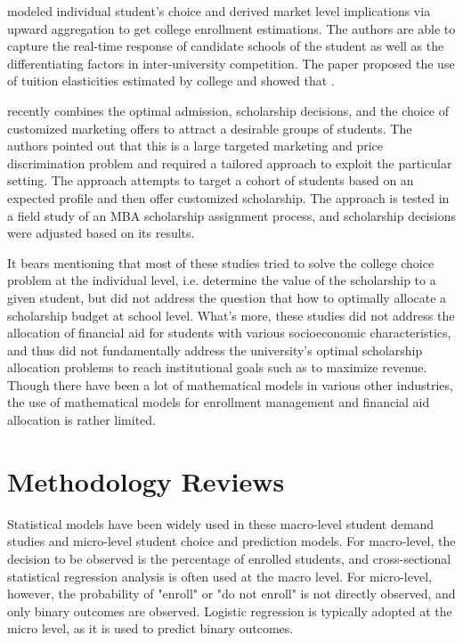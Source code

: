 \documentclass[12pt,english]{report}
\begin{document}
\citet{Carter2011} modeled individual student's choice and derived market level implications via upward aggregation to get college enrollment estimations. The authors are able to capture the real-time response of 
candidate schools of the student as well as the differentiating factors in inter-university competition.
The paper proposed the use of tuition elasticities estimated by college and showed that .

\citet{Belloni2012} recently combines the optimal admission, scholarship decisions, and the choice of customized marketing offers 
to attract a desirable groups of students.  The authors pointed out that this is a large targeted  marketing and price 
discrimination problem and required a tailored approach to exploit the particular setting.  The approach attempts to target a 
cohort of students based on an expected profile and then offer customized scholarship. The approach is tested in a field study of 
an MBA scholarship assignment process, and scholarship decisions were adjusted based on its results.

It bears mentioning that most of these studies tried to solve the college choice problem at the individual level, i.e. determine the value of the scholarship  to a given student, but did not address the question that how to optimally allocate a scholarship budget at school level. What's more, these studies did not address the allocation of financial aid for students with various socioeconomic characteristics, and thus did not fundamentally address the university's optimal scholarship allocation problems to reach institutional goals such as to maximize revenue.  Though there have been a lot of mathematical models in various other industries, the use of mathematical models for enrollment management and financial aid allocation is rather limited.

\section{Methodology Reviews}
Statistical models have been widely used in these macro-level student 
demand studies and micro-level student choice and prediction models. 
For macro-level, the decision to be observed is the percentage of 
enrolled students, and cross-sectional statistical regression 
analysis is often used at the macro level. For micro-level, however, 
the probability of "enroll" or "do not enroll" is not directly 
observed, and only binary outcomes are observed. Logistic regression 
is typically adopted at the micro level, as it is used to predict 
binary outcomes.
\end{document}
